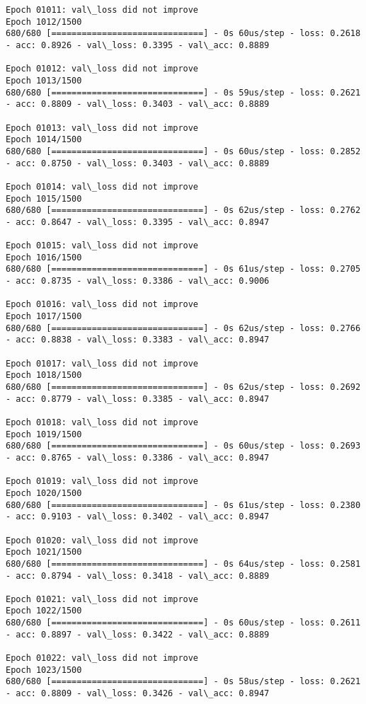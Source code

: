 \documentclass[11pt]{article}
\begin{document}
\begin{Verbatim}[commandchars=\\\{\}]
Epoch 01011: val\_loss did not improve
Epoch 1012/1500
680/680 [==============================] - 0s 60us/step - loss: 0.2618 - acc: 0.8926 - val\_loss: 0.3395 - val\_acc: 0.8889

Epoch 01012: val\_loss did not improve
Epoch 1013/1500
680/680 [==============================] - 0s 59us/step - loss: 0.2621 - acc: 0.8809 - val\_loss: 0.3403 - val\_acc: 0.8889

Epoch 01013: val\_loss did not improve
Epoch 1014/1500
680/680 [==============================] - 0s 60us/step - loss: 0.2852 - acc: 0.8750 - val\_loss: 0.3403 - val\_acc: 0.8889

Epoch 01014: val\_loss did not improve
Epoch 1015/1500
680/680 [==============================] - 0s 62us/step - loss: 0.2762 - acc: 0.8647 - val\_loss: 0.3395 - val\_acc: 0.8947

Epoch 01015: val\_loss did not improve
Epoch 1016/1500
680/680 [==============================] - 0s 61us/step - loss: 0.2705 - acc: 0.8735 - val\_loss: 0.3386 - val\_acc: 0.9006

Epoch 01016: val\_loss did not improve
Epoch 1017/1500
680/680 [==============================] - 0s 62us/step - loss: 0.2766 - acc: 0.8838 - val\_loss: 0.3383 - val\_acc: 0.8947

Epoch 01017: val\_loss did not improve
Epoch 1018/1500
680/680 [==============================] - 0s 62us/step - loss: 0.2692 - acc: 0.8779 - val\_loss: 0.3385 - val\_acc: 0.8947

Epoch 01018: val\_loss did not improve
Epoch 1019/1500
680/680 [==============================] - 0s 60us/step - loss: 0.2693 - acc: 0.8765 - val\_loss: 0.3386 - val\_acc: 0.8947

Epoch 01019: val\_loss did not improve
Epoch 1020/1500
680/680 [==============================] - 0s 61us/step - loss: 0.2380 - acc: 0.9103 - val\_loss: 0.3402 - val\_acc: 0.8947

Epoch 01020: val\_loss did not improve
Epoch 1021/1500
680/680 [==============================] - 0s 64us/step - loss: 0.2581 - acc: 0.8794 - val\_loss: 0.3418 - val\_acc: 0.8889

Epoch 01021: val\_loss did not improve
Epoch 1022/1500
680/680 [==============================] - 0s 60us/step - loss: 0.2611 - acc: 0.8897 - val\_loss: 0.3422 - val\_acc: 0.8889

Epoch 01022: val\_loss did not improve
Epoch 1023/1500
680/680 [==============================] - 0s 58us/step - loss: 0.2621 - acc: 0.8809 - val\_loss: 0.3426 - val\_acc: 0.8947


\end{Verbatim}
\end{document}
